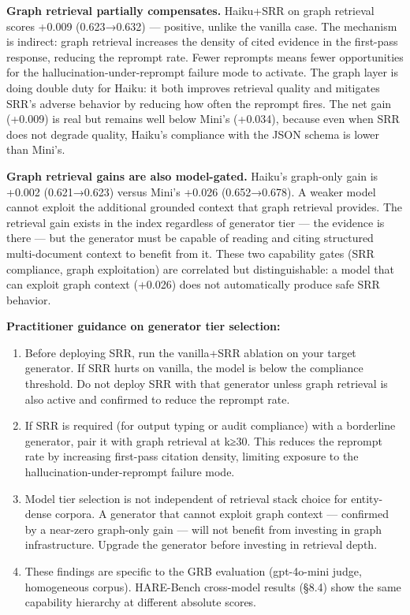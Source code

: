 \documentclass[
]{article}
\providecommand{\tightlist}{%
  \setlength{\itemsep}{0pt}\setlength{\parskip}{0pt}}
\begin{document}
\textbf{Graph retrieval partially compensates.} Haiku+SRR on graph
retrieval scores +0.009 (0.623→0.632) --- positive, unlike the vanilla
case. The mechanism is indirect: graph retrieval increases the density
of cited evidence in the first-pass response, reducing the reprompt
rate. Fewer reprompts means fewer opportunities for the
hallucination-under-reprompt failure mode to activate. The graph layer
is doing double duty for Haiku: it both improves retrieval quality and
mitigates SRR's adverse behavior by reducing how often the reprompt
fires. The net gain (+0.009) is real but remains well below Mini's
(+0.034), because even when SRR does not degrade quality, Haiku's
compliance with the JSON schema is lower than Mini's.

\textbf{Graph retrieval gains are also model-gated.} Haiku's graph-only
gain is +0.002 (0.621→0.623) versus Mini's +0.026 (0.652→0.678). A
weaker model cannot exploit the additional grounded context that graph
retrieval provides. The retrieval gain exists in the index regardless of
generator tier --- the evidence is there --- but the generator must be
capable of reading and citing structured multi-document context to
benefit from it. These two capability gates (SRR compliance, graph
exploitation) are correlated but distinguishable: a model that can
exploit graph context (+0.026) does not automatically produce safe SRR
behavior.

\textbf{Practitioner guidance on generator tier selection:}

\begin{enumerate}
\def\labelenumi{\arabic{enumi}.}
\tightlist
\item
  Before deploying SRR, run the vanilla+SRR ablation on your target
  generator. If SRR hurts on vanilla, the model is below the compliance
  threshold. Do not deploy SRR with that generator unless graph
  retrieval is also active and confirmed to reduce the reprompt rate.
\item
  If SRR is required (for output typing or audit compliance) with a
  borderline generator, pair it with graph retrieval at k≥30. This
  reduces the reprompt rate by increasing first-pass citation density,
  limiting exposure to the hallucination-under-reprompt failure mode.
\item
  Model tier selection is not independent of retrieval stack choice for
  entity-dense corpora. A generator that cannot exploit graph context
  --- confirmed by a near-zero graph-only gain --- will not benefit from
  investing in graph infrastructure. Upgrade the generator before
  investing in retrieval depth.
\item
  These findings are specific to the GRB evaluation (gpt-4o-mini judge,
  homogeneous corpus). HARE-Bench cross-model results (§8.4) show the
  same capability hierarchy at different absolute scores.
\end{enumerate}
\end{document}

